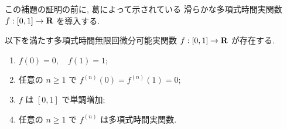  この補題の証明の前に, 葛によって示されている
 滑らかな多項式時間実関数 $f : [0,1] \to \mathbf R$ を導入する.
 
 \begin{lemma}
  \label{SmoothFunction}
  以下を満たす多項式時間無限回微分可能実関数 $f : [0,1] \to \mathbf R$ が存在する.
  \begin{enumerate}
   \item $f(0) = 0, \quad f(1) = 1$;
   \item 任意の $n \ge 1$ で $f^{(n)}(0) = f^{(n)}(1) = 0$;
   \item $f$ は $[0,1]$ で単調増加;
   \item 任意の $n \ge 1$ で $f^{(n)}$ は多項式時間実関数.
  \end{enumerate}
 \end{lemma} 

